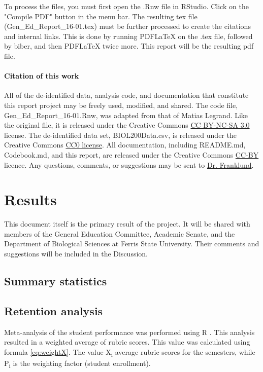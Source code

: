 \documentclass[fleqn,10pt]{SelfArx}\usepackage[]{graphicx}\usepackage[]{color}
\begin{document}
To process the files, you must first open the .Rnw file in RStudio. Click on the "Compile PDF" button in the menu bar. The resulting tex file (Gen\_Ed\_Report\_16-01.tex) must be further processed to create the citations and internal links. This is done by running PDFLaTeX on the .tex file, followed by biber, and then PDFLaTeX twice more. This report will be the resulting pdf file.

\paragraph{Citation of this work}
All of the de-identified data, analysis code, and documentation that constitute this report project may be freely used, modified, and shared. The code file, Gen\_Ed\_Report\_16-01.Rnw, was adapted from that of Matias Legrand. Like the original file, it is released under the Creative Commons \href{http://creativecommons.org/licenses/by-nc-sa/3.0/}{CC BY-NC-SA 3.0} license. The de-identified data set, BIOL200Data.csv, is released under the Creative Commons \href{https://creativecommons.org/publicdomain/zero/1.0/}{CC0 license}. All documentation, including README.md, Codebook.md, and this report, are released under the Creative Commons \href{https://creativecommons.org/licenses/by/4.0/}{CC-BY} licence. Any questions, comments, or suggestions may be sent to \href{mailto:CliftonFranklund@ferris.edu}{Dr. Franklund}.


\section{Results}
This document itself is the primary result of the project. It will be shared with members of the General Education Committee, Academic Senate, and the Department of Biological Sciences at Ferris State University. Their comments and suggestions will be included in the Discussion.

\subsection{Summary statistics}





\subsection{Retention analysis}
Meta-analysis of the student performance was performed using R \citep{TQMP11-1-37}. This analysis resulted in a weighted average of rubric scores. This value was calculated using formula \ref{eq:weightX}. The value X\textsubscript{i} average rubric scores for the semesters, while P\textsubscript{i} is the weighting factor (student enrollment).
\end{document}
